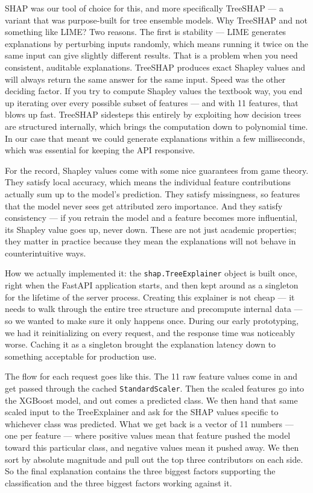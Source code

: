 SHAP \cite{17} was our tool of choice for this, and more specifically TreeSHAP \cite{18} --- a variant that was purpose-built for tree ensemble models. Why TreeSHAP and not something like LIME? Two reasons. The first is stability --- LIME generates explanations by perturbing inputs randomly, which means running it twice on the same input can give slightly different results. That is a problem when you need consistent, auditable explanations. TreeSHAP produces exact Shapley values and will always return the same answer for the same input. Speed was the other deciding factor. If you try to compute Shapley values the textbook way, you end up iterating over every possible subset of features --- and with 11 features, that blows up fast. TreeSHAP sidesteps this entirely by exploiting how decision trees are structured internally, which brings the computation down to polynomial time. In our case that meant we could generate explanations within a few milliseconds, which was essential for keeping the API responsive.

For the record, Shapley values come with some nice guarantees from game theory. They satisfy local accuracy, which means the individual feature contributions actually sum up to the model's prediction. They satisfy missingness, so features that the model never sees get attributed zero importance. And they satisfy consistency --- if you retrain the model and a feature becomes more influential, its Shapley value goes up, never down. These are not just academic properties; they matter in practice because they mean the explanations will not behave in counterintuitive ways.

How we actually implemented it: the \texttt{shap.TreeExplainer} object is built once, right when the FastAPI application starts, and then kept around as a singleton for the lifetime of the server process. Creating this explainer is not cheap --- it needs to walk through the entire tree structure and precompute internal data --- so we wanted to make sure it only happens once. During our early prototyping, we had it reinitializing on every request, and the response time was noticeably worse. Caching it as a singleton brought the explanation latency down to something acceptable for production use.

The flow for each request goes like this. The 11 raw feature values come in and get passed through the cached \texttt{StandardScaler}. Then the scaled features go into the XGBoost model, and out comes a predicted class. We then hand that same scaled input to the TreeExplainer and ask for the SHAP values specific to whichever class was predicted. What we get back is a vector of 11 numbers --- one per feature --- where positive values mean that feature pushed the model toward this particular class, and negative values mean it pushed away. We then sort by absolute magnitude and pull out the top three contributors on each side. So the final explanation contains the three biggest factors supporting the classification and the three biggest factors working against it.

